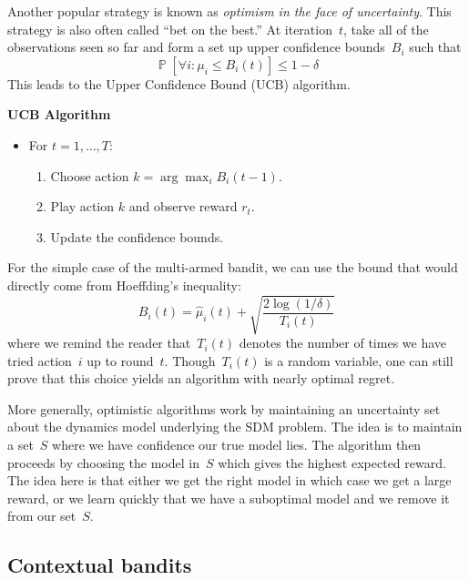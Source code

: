\documentclass{tufte-book}
\begin{document}
Another popular strategy is known as \emph{optimism in the face of
uncertainty}. This strategy is also often called ``bet
on the best.'' At iteration~\(t\), take all of the observations seen so
far and form a set up upper confidence bounds~\(B_i\) such that \[
\mathop\mathbb{P}[\forall i\colon \mu_i \leq  B_i(t)] \leq 1-\delta
\] This leads to the Upper Confidence Bound (UCB)
algorithm.

\begin{Algorithm}

\textbf{UCB Algorithm}

\begin{itemize}
\tightlist
\item
  For \(t=1,\ldots, T\):

  \begin{enumerate}
  \def\labelenumi{\arabic{enumi}.}
  \tightlist
  \item
    Choose action \(k = \arg \max_i B_i(t-1)\).
  \item
    Play action \(k\) and observe reward \(r_t\).
  \item
    Update the confidence bounds.
  \end{enumerate}
\end{itemize}

\end{Algorithm}

For the simple case of the multi-armed bandit, we can use the bound that
would directly come from Hoeffding's inequality: \[
        B_i(t) = \hat{\mu}_i(t) + \sqrt{\frac{2 \log (1/\delta)}{T_i(t)}}
\] where we remind the reader that~\(T_i(t)\) denotes the number of
times we have tried action~\(i\) up to round~\(t\). Though~\(T_i(t)\) is
a random variable, one can still prove that this choice yields an
algorithm with nearly optimal regret.

More generally, optimistic algorithms work by maintaining an uncertainty
set about the dynamics model underlying the SDM problem. The idea is to
maintain a set~\(S\) where we have confidence our true model lies. The
algorithm then proceeds by choosing the model in~\(S\) which gives the
highest expected reward. The idea here is that either we get the right
model in which case we get a large reward, or we learn quickly that we
have a suboptimal model and we remove it from our set~\(S\).

\hypertarget{contextual-bandits}{%
\subsection{Contextual bandits}\label{contextual-bandits}}
\end{document}

